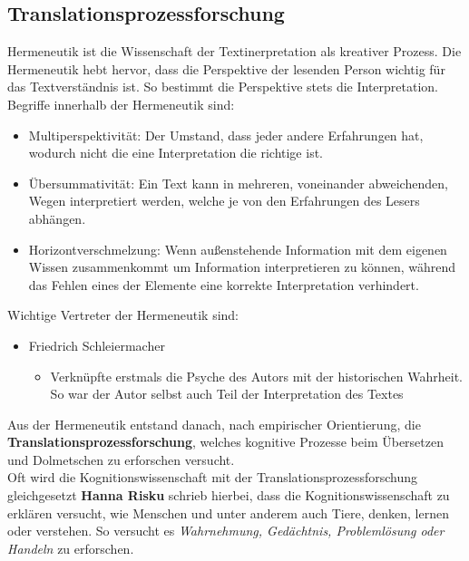 \documentclass{article}
\begin{document}
	\subsection{Translationsprozessforschung}
	Hermeneutik ist die Wissenschaft der Textinerpretation als kreativer Prozess. Die Hermeneutik hebt hervor, dass die Perspektive der lesenden Person wichtig für das Textverständnis ist. So bestimmt die Perspektive stets die Interpretation. \\
	Begriffe innerhalb der Hermeneutik sind:
	\begin{itemize}
		\item{Multiperspektivität: Der Umstand, dass jeder andere Erfahrungen hat, wodurch nicht die eine Interpretation die richtige ist.}
		\item{Übersummativität: Ein Text kann in mehreren, voneinander abweichenden, Wegen interpretiert werden, welche je von den Erfahrungen des Lesers abhängen.}
		\item{Horizontverschmelzung: Wenn außenstehende Information mit dem eigenen Wissen zusammenkommt um Information interpretieren zu können, während das Fehlen eines der Elemente eine korrekte Interpretation verhindert.}
	\end{itemize}
	Wichtige Vertreter der Hermeneutik sind:
	\begin{itemize}
		\item{Friedrich Schleiermacher}
		\begin{itemize}
			\item{Verknüpfte erstmals die Psyche des Autors mit der historischen Wahrheit. So war der Autor selbst auch Teil der Interpretation des Textes}
		\end{itemize}
	\end{itemize}
	Aus der Hermeneutik entstand danach, nach empirischer Orientierung, die \textbf{Translationsprozessforschung}, welches kognitive Prozesse beim Übersetzen und Dolmetschen zu erforschen versucht. \\
	Oft wird die Kognitionswissenschaft mit der Translationsprozessforschung gleichgesetzt
	\textbf{Hanna Risku} schrieb hierbei, dass die Kognitionswissenschaft zu erklären versucht, wie Menschen und unter anderem auch Tiere, denken, lernen oder verstehen. So versucht es \textit{Wahrnehmung, Gedächtnis, Problemlösung oder Handeln} zu erforschen. \\

	
	


	



	   
























	
\end{document}
